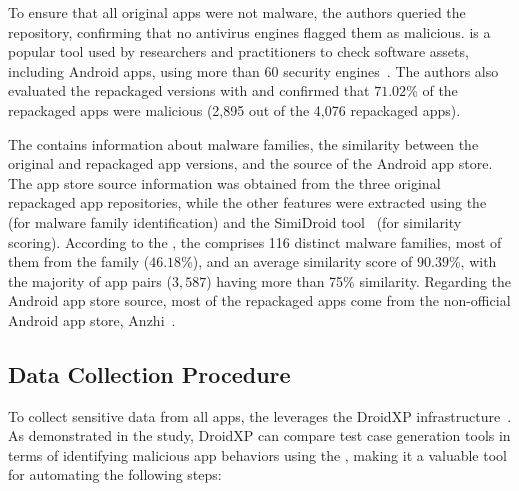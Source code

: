 To ensure that all original apps were not malware, the authors queried the \vt repository, confirming that no antivirus engines flagged them as malicious. \vt is a popular tool used by researchers and practitioners to check software assets, including Android apps, using more than 60 security engines~\cite{DBLP:journals/ese/KhanmohammadiEH19}. The authors also evaluated the repackaged versions with \vt and confirmed that $71.02$\% of the repackaged apps were malicious (2,895 out of the 4,076 repackaged apps).

The \cds contains information about malware families, the similarity between the original and repackaged app versions, and the source of the Android app store. The app store source information was obtained from the three original repackaged app repositories, while the other features were extracted using the \avt~\cite{avclass2-paper} (for malware family identification) and the SimiDroid tool~\cite{DBLP:conf/trustcom/0029BK17} (for similarity scoring). According to the \fhc, the \cds comprises 116 distinct malware families, most of them from the \gps family ($46.18$\%), and an average similarity score of $90.39$\%, with the majority of app pairs ($3,587$) having more than 75\% similarity. Regarding the Android app store source, most of the repackaged apps come from the non-official Android app store, Anzhi~\cite{anzhi}.



\subsection{\mas Data Collection Procedure}\label{sec:mas}


To collect sensitive data from all apps, the \fhc leverages the DroidXP infrastructure~\cite{DBLP:conf/scam/CostaMCMVBC20}. As demonstrated in the study, DroidXP can compare test case generation tools in terms of identifying malicious app behaviors using the \mas, making it a valuable tool for automating the following steps:



